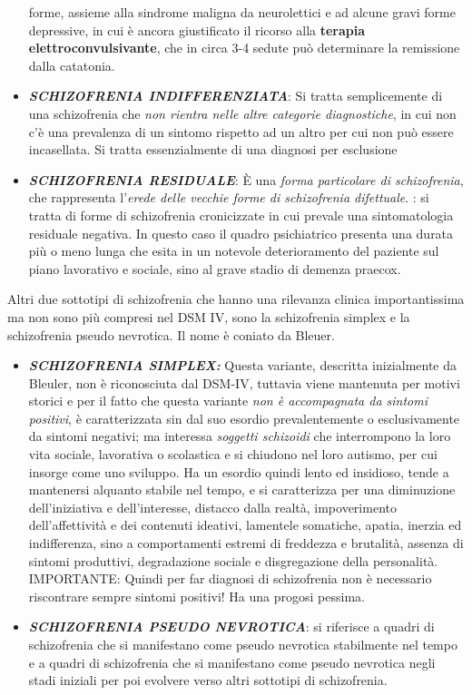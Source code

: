 \documentclass[]{article}
\begin{document}
\begin{itemize}
  forme, assieme alla sindrome maligna da neurolettici e ad alcune gravi
  forme depressive, in cui è ancora giustificato il ricorso alla
  \textbf{terapia elettroconvulsivante}, che in circa 3-4 sedute può
  determinare la remissione dalla catatonia.
\item
  \textbf{\emph{SCHIZOFRENIA INDIFFERENZIATA}}: Si tratta semplicemente
  di una schizofrenia che \emph{non rientra nelle altre categorie
  diagnostiche}, in cui non c'è una prevalenza di un sintomo rispetto ad
  un altro per cui non può essere incasellata. Si tratta essenzialmente
  di una diagnosi per esclusione
\item
  \textbf{\emph{SCHIZOFRENIA RESIDUALE}}: È una \emph{forma particolare
  di schizofrenia}, che rappresenta l'\emph{erede delle vecchie forme di
  schizofrenia difettuale}. : si tratta di forme di schizofrenia
  cronicizzate in cui prevale una sintomatologia residuale negativa. In
  questo caso il quadro psichiatrico presenta una durata più o meno
  lunga che esita in un notevole deterioramento del paziente sul piano
  lavorativo e sociale, sino al grave stadio di demenza praecox.
\end{itemize}

Altri due sottotipi di schizofrenia che hanno una rilevanza clinica
importantissima ma non sono più compresi nel DSM IV, sono la
schizofrenia simplex e la schizofrenia pseudo nevrotica. Il nome è
coniato da Bleuer.

\begin{itemize}
\item
  \textbf{\emph{SCHIZOFRENIA SIMPLEX:}} Questa variante, descritta
  inizialmente da Bleuler, non è riconosciuta dal DSM-IV, tuttavia viene
  mantenuta per motivi storici e per il fatto che questa variante
  \emph{non è accompagnata da sintomi positivi}, è caratterizzata sin
  dal suo esordio prevalentemente o esclusivamente da sintomi negativi;
  ma interessa \emph{soggetti schizoidi} che interrompono la loro vita
  sociale, lavorativa o scolastica e si chiudono nel loro autismo, per
  cui insorge come uno sviluppo. Ha un esordio quindi lento ed
  insidioso, tende a mantenersi alquanto stabile nel tempo, e si
  caratterizza per una diminuzione dell'iniziativa e dell'interesse,
  distacco dalla realtà, impoverimento dell'affettività e dei contenuti
  ideativi, lamentele somatiche, apatia, inerzia ed indifferenza, sino a
  comportamenti estremi di freddezza e brutalità, assenza di sintomi
  produttivi, degradazione sociale e disgregazione della personalità.
  IMPORTANTE: Quindi per far diagnosi di schizofrenia non è necessario
  riscontrare sempre sintomi positivi! Ha una progosi pessima.
\item
  \textbf{\emph{SCHIZOFRENIA PSEUDO NEVROTICA}}: si riferisce a quadri
  di schizofrenia che si manifestano come pseudo nevrotica stabilmente
  nel tempo e a quadri di schizofrenia che si manifestano come pseudo
  nevrotica negli stadi iniziali per poi evolvere verso altri sottotipi
  di schizofrenia.
\end{itemize}
\end{document}
